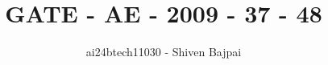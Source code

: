 \documentclass[journal]{IEEEtran}
\begin{document}
\onecolumn

\vspace{3cm}

\renewcommand{\thefigure}{\theenumi}
\renewcommand{\thetable}{\theenumi}

\title{GATE - AE - 2009 - 37 - 48}
\author{ai24btech11030 - Shiven Bajpai}
\maketitle

\iffalse
\begin{multicols}{4}
\begin{enumerate}
    \item 
    \item 
    \item 
    \item 
\end{enumerate}
\end{multicols}
\fi
\end{document}
